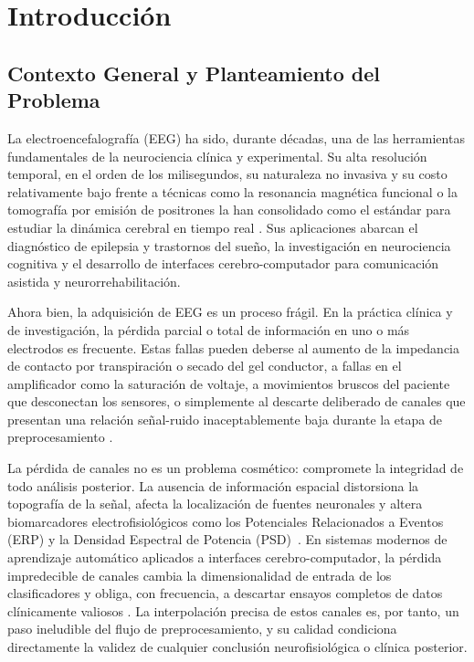 \chapter{Introducción}

\section{Contexto General y Planteamiento del Problema}

La electroencefalografía (EEG) ha sido, durante décadas, una de las herramientas fundamentales de la neurociencia clínica y experimental. Su alta resolución temporal, en el orden de los milisegundos, su naturaleza no invasiva y su costo relativamente bajo frente a técnicas como la resonancia magnética funcional o la tomografía por emisión de positrones la han consolidado como el estándar para estudiar la dinámica cerebral en tiempo real \cite{buzsaki2006rhythms}. Sus aplicaciones abarcan el diagnóstico de epilepsia y trastornos del sueño, la investigación en neurociencia cognitiva y el desarrollo de interfaces cerebro-computador para comunicación asistida y neurorrehabilitación.

Ahora bien, la adquisición de EEG es un proceso frágil. En la práctica clínica y de investigación, la pérdida parcial o total de información en uno o más electrodos es frecuente. Estas fallas pueden deberse al aumento de la impedancia de contacto por transpiración o secado del gel conductor, a fallas en el amplificador como la saturación de voltaje, a movimientos bruscos del paciente que desconectan los sensores, o simplemente al descarte deliberado de canales que presentan una relación señal-ruido inaceptablemente baja durante la etapa de preprocesamiento \cite{nunez2006electric}.

La pérdida de canales no es un problema cosmético: compromete la integridad de todo análisis posterior. La ausencia de información espacial distorsiona la topografía de la señal, afecta la localización de fuentes neuronales y altera biomarcadores electrofisiológicos como los Potenciales Relacionados a Eventos (ERP) y la Densidad Espectral de Potencia (PSD)~\cite{luck2014introduction}. En sistemas modernos de aprendizaje automático aplicados a interfaces cerebro-computador, la pérdida impredecible de canales cambia la dimensionalidad de entrada de los clasificadores y obliga, con frecuencia, a descartar ensayos completos de datos clínicamente valiosos \cite{lotte2018review}. La interpolación precisa de estos canales es, por tanto, un paso ineludible del flujo de preprocesamiento, y su calidad condiciona directamente la validez de cualquier conclusión neurofisiológica o clínica posterior.

